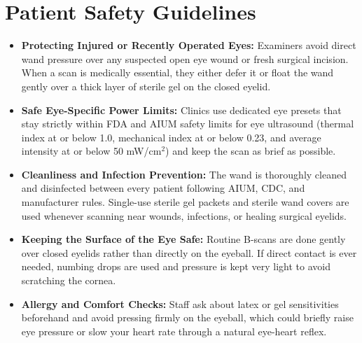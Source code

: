 \section{Patient Safety Guidelines}
\begin{itemize}
    \item \textbf{Protecting Injured or Recently Operated Eyes:} Examiners avoid direct wand pressure over any suspected open eye wound or fresh surgical incision. When a scan is medically essential, they either defer it or float the wand gently over a thick layer of sterile gel on the closed eyelid.
    \item \textbf{Safe Eye-Specific Power Limits:} Clinics use dedicated eye presets that stay strictly within FDA and AIUM safety limits for eye ultrasound (thermal index at or below 1.0, mechanical index at or below 0.23, and average intensity at or below 50 mW/cm$^2$) and keep the scan as brief as possible.
    \item \textbf{Cleanliness and Infection Prevention:} The wand is thoroughly cleaned and disinfected between every patient following AIUM, CDC, and manufacturer rules. Single-use sterile gel packets and sterile wand covers are used whenever scanning near wounds, infections, or healing surgical eyelids.
    \item \textbf{Keeping the Surface of the Eye Safe:} Routine B-scans are done gently over closed eyelids rather than directly on the eyeball. If direct contact is ever needed, numbing drops are used and pressure is kept very light to avoid scratching the cornea.
    \item \textbf{Allergy and Comfort Checks:} Staff ask about latex or gel sensitivities beforehand and avoid pressing firmly on the eyeball, which could briefly raise eye pressure or slow your heart rate through a natural eye-heart reflex.
\end{itemize}

